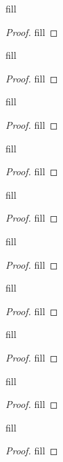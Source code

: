 \begin{exercise}{19}
fill
\end{exercise}
\begin{proof}
fill
\end{proof} 

\begin{exercise}{21}
fill
\end{exercise}
\begin{proof}
fill
\end{proof} 

\begin{exercise}{24}
fill
\end{exercise}
\begin{proof}
fill
\end{proof} 

\begin{exercise}{25}
fill
\end{exercise}
\begin{proof}
fill
\end{proof} 

\begin{exercise}{26}
fill
\end{exercise}
\begin{proof}
fill
\end{proof} 

\begin{exercise}{28}
fill
\end{exercise}
\begin{proof}
fill
\end{proof} 

\begin{exercise}{29}
fill
\end{exercise}
\begin{proof}
fill
\end{proof} 

\begin{exercise}{30}
fill
\end{exercise}
\begin{proof}
fill
\end{proof} 

\begin{exercise}{31}
fill
\end{exercise}
\begin{proof}
fill
\end{proof} 

\begin{exercise}{32}
fill
\end{exercise}
\begin{proof}
fill
\end{proof} 

